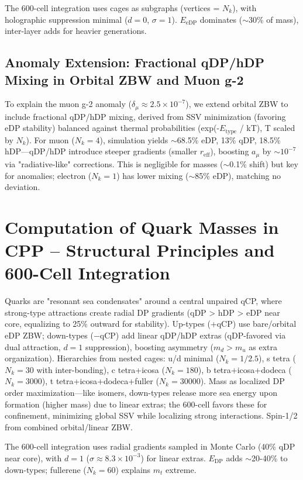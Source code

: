 \documentclass{article}
\begin{document}
The 600-cell integration uses cages as subgraphs (vertices = $N_k$), with holographic suppression minimal ($d=0$, $\sigma=1$). $E_{\text{eDP}}$ dominates ($\sim$30\% of mass), inter-layer adds for heavier generations.

\subsection{Anomaly Extension: Fractional qDP/hDP Mixing in Orbital ZBW and Muon g-2}

To explain the muon g-2 anomaly ($\delta_\mu \approx 2.5 \times 10^{-7}$), we extend orbital ZBW to include fractional qDP/hDP mixing, derived from SSV minimization (favoring eDP stability) balanced against thermal probabilities (exp(-$E_{\text{type}}$ / kT), T scaled by $N_k$). For muon ($N_k=4$), simulation yields $\sim$68.5\% eDP, 13\% qDP, 18.5\% hDP—qDP/hDP introduce steeper gradients (smaller $r_{\text{eff}}$), boosting $a_\mu$ by $\sim 10^{-7}$ via "radiative-like" corrections. This is negligible for masses ($\sim$0.1\% shift) but key for anomalies; electron ($N_k=1$) has lower mixing ($\sim$85\% eDP), matching no deviation.

\section{Computation of Quark Masses in CPP -- Structural Principles and 600-Cell Integration}

Quarks are "resonant sea condensates" around a central unpaired qCP, where strong-type attractions create radial DP gradients (qDP > hDP > eDP near core, equalizing to 25\% outward for stability). Up-types (+qCP) use bare/orbital eDP ZBW; down-types (−qCP) add linear qDP/hDP extras (qDP-favored via dual attraction, $d=1$ suppression), boosting asymmetry ($m_d > m_u$ as extra organization). Hierarchies from nested cages: u/d minimal ($N_k=1/2.5$), s tetra ($N_k=30$ with inter-bonding), c tetra+icosa ($N_k=180$), b tetra+icosa+dodeca ($N_k=3000$), t tetra+icosa+dodeca+fuller ($N_k=30000$). Mass as localized DP order maximization—like isomers, down-types release more sea energy upon formation (higher mass) due to linear extras; the 600-cell favors these for confinement, minimizing global SSV while localizing strong interactions. Spin-1/2 from combined orbital/linear ZBW.

The 600-cell integration uses radial gradients sampled in Monte Carlo (40\% qDP near core), with $d=1$ ($\sigma\approx8.3\times10^{-3}$) for linear extras. $E_{\text{DP}}$ adds $\sim$20-40\% to down-types; fullerene ($N_k=60$) explains $m_t$ extreme.
\end{document}
